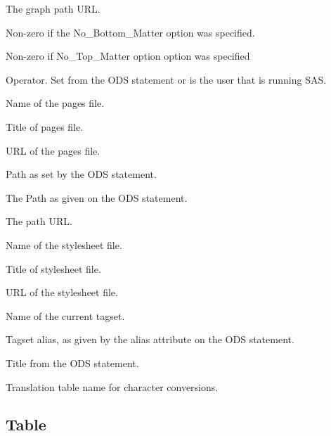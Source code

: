 \begin{description}
The graph path URL.

Non-zero if the No\_Bottom\_Matter option was specified.

Non-zero if No\_Top\_Matter option option was specified

Operator. Set from the ODS statement or is the user that is running SAS.

Name of the pages file.

Title of pages file.

URL of the pages file.

Path as set by the ODS statement.

The Path as given on the ODS statement.

The path URL.

Name of the stylesheet file.

Title of stylesheet file.

URL of the stylesheet file.

Name of the current tagset.

Tagset alias, as given by the alias attribute on the ODS statement.

Title from the ODS statement.

Translation table name for character conversions.

\end{description}

\subsection{Table}

